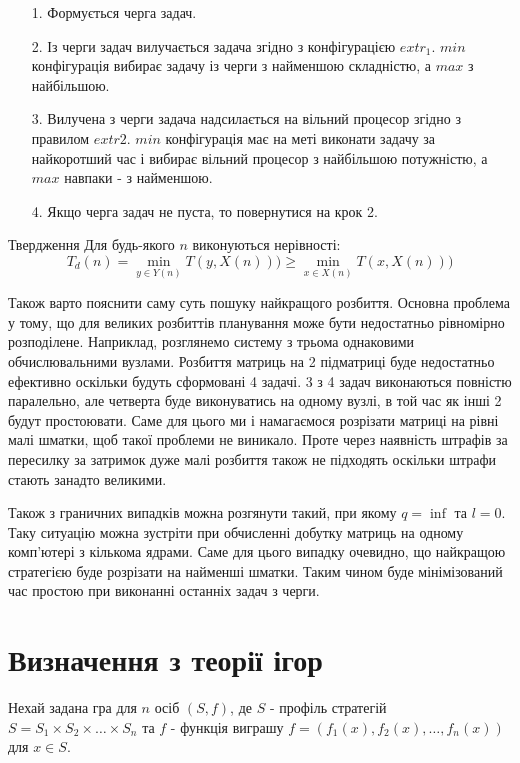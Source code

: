 \begin{itemize}
	\item[1.] Формується черга задач.
	\item[2.] Із черги задач вилучається задача згідно з конфігурацією $extr_1$. $min$ конфігурація вибирає задачу із черги з найменшою складністю, а $max$ з найбільшою.
	\item[3.] Вилучена з черги задача надсилається на вільний процесор згідно з правилом $extr2$. $min$ конфігурація має на меті виконати задачу за найкоротший час і вибирає вільний процесор з найбільшою потужністю, а $max$ навпаки - з найменшою.
	\item[4.] Якщо черга задач не пуста, то повернутися на крок 2.
\end{itemize}

Твердження
Для будь-якого $n$ виконуються нерівності:
\begin{equation}
	T_d(n) = \min\limits_{y \in Y(n)} T(y, X(n))) \ge \min\limits_{x \in X(n)} T(x, X(n)))
\end{equation}

Також варто пояснити саму суть пошуку найкращого розбиття. Основна проблема у тому, що для великих розбиттів планування може бути недостатньо рівномірно розподілене. Наприклад, розглянемо систему з трьома однаковими обчислювальними вузлами. Розбиття матриць на 2 підматриці буде недостатньо ефективно оскільки будуть сформовані 4 задачі. 3 з 4 задач виконаються повністю паралельно, але четверта буде виконуватись на одному вузлі, в той час як інші 2 будут простоювати. Саме для цього ми і намагаємося розрізати матриці на рівні малі шматки, щоб такої проблеми не виникало. Проте через наявність штрафів за пересилку за затримок дуже малі розбиття також не підходять оскільки штрафи стають занадто великими.

Також з граничних випадків можна розгянути такий, при якому $q=\inf$ та $l=0$. Таку ситуацію можна зустріти при обчисленні добутку матриць на одному комп'ютері з кількома ядрами. Саме для цього випадку очевидно, що найкращою стратегією буде розрізати на найменші шматки. Таким чином буде мінімізований час простою при виконанні останніх задач з черги.

\section{Визначення з теорії ігор}

Нехай задана гра для $n$ осіб $(S,f)$, де $S$ - профіль стратегій $S=S_1 \times S_2 \times \ldots \times S_n$ та $f$ - функція виграшу $f=(f_1(x),f_2(x), \ldots, f_n(x))$ для $x \in S$.

